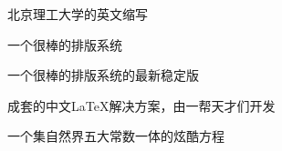 
\begin{symbols}
  \item[BIT] 北京理工大学的英文缩写
  \item[\LaTeX] 一个很棒的排版系统
  \item[\LaTeXe] 一个很棒的排版系统的最新稳定版
  \item[ctex] 成套的中文\LaTeX{}解决方案，由一帮天才们开发
  \item[$ e^{\pi{}i}+1=0$] 一个集自然界五大常数一体的炫酷方程
\end{symbols}
